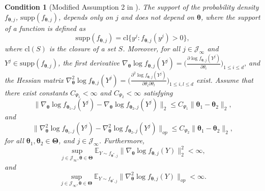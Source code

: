 \documentclass[12pt]{article}
\newcommand{\bfTheta}{\boldsymbol{\Theta}}
\newcommand{\bftheta}{\boldsymbol{\theta}}
\newtheorem{condition}{Condition}[section]
\begin{document}
\begin{condition}[Modified Assumption 2 in ] \label{c:c2'}
The support of the probability density $f_{\bftheta, j}$, $\mathrm{supp}(f_{\bftheta,j})$, depends only on $j$ and does not depend on $\bftheta$, where the support of a function is defined as
$$
\mathrm{supp}( f_{\bftheta, j} ) = \mathrm{cl} \{ y^j : f_{\bftheta, j}(y^j) > 0\},
$$
where $\mathrm{cl}(S)$ is the closure of a set $S$. Moreover, for all $j \in \mathcal{J}_{\infty}$ and $Y^j \in \mathrm{supp}(f_{\bftheta,j})$, the first derivative $\nabla_{\bftheta} \log f_{\bftheta, j}(Y^j) = \Big( \frac{\partial \log f_{\bftheta, j}(Y^j)}{\partial \theta_i} \Big)_{1 \leq i \leq d}$, and the Hessian matrix $\nabla_{\bftheta}^2 \log f_{\bftheta, j}(Y^j) = \Big( \frac{\partial^2 \log f_{\bftheta, j}(Y^j)}{ \partial \theta_i \partial \theta_l} \Big)_{1 \leq i,l \leq d}$ exist. Assume that there exist constants $C_{\Psi_1} < \infty$ and $C_{\Psi_2} < \infty$ satisfying 
\begin{equation*}
\| \nabla_{\bftheta} \log f_{\bftheta_1, j}(Y^j) - \nabla_{\bftheta} \log f_{\bftheta_2,j}(Y^j) \|_2 \leq C_{\Psi_1} \| \bftheta_1 - \bftheta_2 \|_2,
\end{equation*}
and
\begin{equation*}
\| \nabla_{\bftheta}^2 \log f_{\bftheta_1, j}(Y^j) - \nabla_{\bftheta}^2 \log f_{\bftheta_2,j}(Y^j) \|_{op} \leq C_{\Psi_2} \| \bftheta_1 - \bftheta_2 \|_2,
\end{equation*}
for all $\bftheta_1, \bftheta_2 \in \bfTheta$, and $j \in \mathcal{J}_{\infty}$. Furthermore, 
\begin{equation*}
\sup_{j \in \mathcal{J}_{\infty}, \bftheta \in \bfTheta} \mathbb{E}_{Y \sim f_{\bftheta^{\ast}, j}} \| \nabla_{\bftheta} \log f_{\bftheta,j}(Y) \|_2^2 < \infty,
\end{equation*}
and
\begin{equation*}
\sup_{j \in \mathcal{J}_{\infty}, \bftheta \in \bfTheta} \mathbb{E}_{Y \sim f_{\bftheta^{\ast}, j}} \| \nabla_{\bftheta}^2 \log f_{\bftheta,j}(Y) \|_{op} < \infty.
\end{equation*}
\end{condition}
\end{document}
